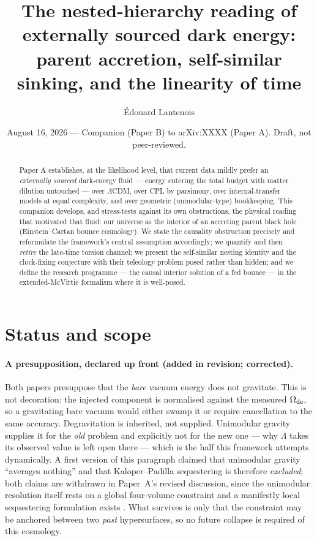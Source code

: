 \documentclass[11pt]{article}
\title{\bf The nested-hierarchy reading of externally sourced dark energy:\\ parent accretion, self-similar sinking, and the linearity of time}
\author[1]{\'Edouard Lantenois}
\affil[1]{\small Independent researcher, Lille, France --- \texttt{github.com/Dantenos}}
\date{August 16, 2026 --- Companion (Paper B) to arXiv:XXXX (Paper A). Draft, not peer-reviewed.}
\begin{document}
\maketitle
\begin{abstract}
Paper A establishes, at the likelihood level, that current data mildly prefer an \emph{externally sourced} dark-energy fluid --- energy entering the total budget with matter dilution untouched --- over $\Lambda$CDM, over CPL by parsimony, over internal-transfer models at equal complexity, and over geometric (unimodular-type) bookkeeping. This companion develops, and stress-tests against its own obstructions, the physical reading that motivated that fluid: our universe as the interior of an accreting parent black hole (Einstein--Cartan bounce cosmology). We state the causality obstruction precisely and reformulate the framework's central assumption accordingly; we quantify and then \emph{retire} the late-time torsion channel; we present the self-similar nesting identity and the clock-fixing conjecture with their teleology problem posed rather than hidden; and we define the research programme --- the causal interior solution of a fed bounce --- in the extended-McVittie formalism where it is well-posed.
\end{abstract}

\section{Status and scope}
\paragraph{A presupposition, declared up front (added in revision; corrected).} Both papers
presuppose that the \emph{bare} vacuum energy does not gravitate. This is not decoration: the
injected component is normalised against the measured $\Omega_{\rm de}$, so a gravitating bare
vacuum would either swamp it or require cancellation to the same accuracy. Degravitation is
inherited, not supplied. Unimodular gravity supplies it for the \emph{old} problem and explicitly
not for the new one --- why $\Lambda$ takes its observed value is left open there
\cite{Weinberg1989b,Salvio2024b} --- which is the half this framework attempts dynamically. A first
version of this paragraph claimed that unimodular gravity ``averages nothing'' and that
Kaloper--Padilla sequestering is therefore \emph{excluded}; both claims are withdrawn in Paper~A's
revised discussion, since the unimodular resolution itself rests on a global four-volume constraint
\cite{Jirousek2023b} and a manifestly local sequestering formulation exists \cite{KPSZ2016b}. What
survives is only that the constraint may be anchored between two \emph{past} hypersurfaces, so no
future collapse is required of this cosmology.
\end{document}

